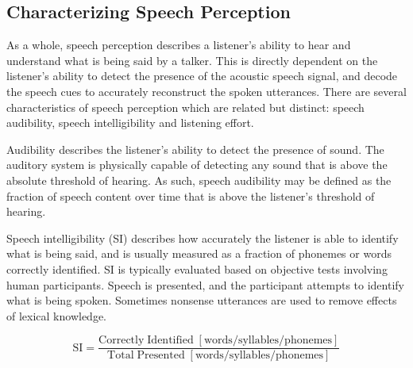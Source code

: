 \subsection{Characterizing Speech Perception} \label{section_perception}

As a whole, speech perception describes a listener's ability to hear and understand what is being said by a talker. This is directly dependent on the listener's ability to detect the presence of the acoustic speech signal, and decode the speech cues to accurately reconstruct the spoken utterances. There are several characteristics of speech perception which are related but distinct: speech audibility, speech intelligibility and listening effort.

Audibility describes the listener's ability to detect the presence of sound. The auditory system is physically capable of detecting any sound that is above the absolute threshold of hearing. As such, speech audibility may be defined as the fraction of speech content over time that is above the listener's threshold of hearing.

Speech intelligibility (SI) describes how accurately the listener is able to identify what is being said, and is usually measured as a fraction of phonemes or words correctly identified. SI is typically evaluated based on objective tests involving human participants. Speech is presented, and the participant attempts to identify what is being spoken. Sometimes nonsense utterances are used to remove effects of lexical knowledge. 

\begin{equation}
	\mathrm{SI} = \frac{\mathrm{Correctly \; Identified \; [words/syllables/phonemes]}}{\mathrm{Total \; Presented \;  [words/syllables/phonemes]}}
\end{equation}

